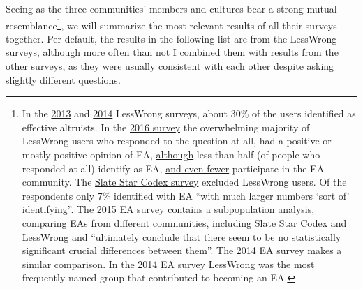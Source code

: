 Seeing as the three communities' members and cultures bear a strong
mutual resemblance\footnote{In the
  \href{http://lesswrong.com/lw/jj0/2013_survey_results/}{2013}
  and
  \href{http://lesswrong.com/lw/lhg/2014_survey_results/}{2014}
  LessWrong surveys, about 30\% of the users identified as effective
  altruists. In the
  \href{https://web.archive.org/web/20161019073217/http://jdpressman.com/public/lwsurvey2016/Survey_554193_LessWrong_Diaspora_2016_Survey\%282\%29.pdf\#page=158}{2016
  survey} the overwhelming majority of LessWrong users who responded to
  the question at all, had a positive or mostly positive opinion of EA,
  \href{https://web.archive.org/web/20161019073217/http://jdpressman.com/public/lwsurvey2016/Survey_554193_LessWrong_Diaspora_2016_Survey\%282\%29.pdf\#page=154}{although}
  less than half (of people who responded at all) identify as EA,
  \href{https://web.archive.org/web/20161019073217/http://jdpressman.com/public/lwsurvey2016/Survey_554193_LessWrong_Diaspora_2016_Survey\%282\%29.pdf\#page=155}{and
  even fewer} participate in the EA community. The
  \href{http://slatestarcodex.com/2015/11/04/2014-ssc-survey-results/}{Slate
  Star Codex survey} excluded LessWrong users. Of the respondents only
  7\% identified with EA ``with much larger numbers `sort of'
  identifying''. The 2015 EA survey
  \href{https://eahub.org/sites/eahub.org/files/SurveyReport2015.pdf\#page=27}{contains}
  a subpopulation analysis, comparing EAs from different communities,
  including Slate Star Codex and LessWrong and ``ultimately conclude
  that there seem to be no statistically significant crucial differences
  between them''. The
  \href{https://webcache.googleusercontent.com/search?q=cache:nmlsoMrw1JMJ:https://eahub.org/sites/effectivealtruismhub.com/files/survey/2014/results-and-analysis.pdf+\&cd=1\&hl=en\&ct=clnk\&gl=de}{2014
  EA survey} makes a similar comparison. In the
  \href{https://webcache.googleusercontent.com/search?q=cache:nmlsoMrw1JMJ:https://eahub.org/sites/effectivealtruismhub.com/files/survey/2014/results-and-analysis.pdf+\&cd=1\&hl=en\&ct=clnk\&gl=de}{2014
  EA survey} LessWrong was the most frequently named group that
  contributed to becoming an EA.}, we will summarize the most relevant
results of all their surveys together. Per default, the results in the
following list are from the LessWrong surveys, although more often than
not I combined them with results from the other surveys, as they were
usually consistent with each other despite asking slightly different
questions.

